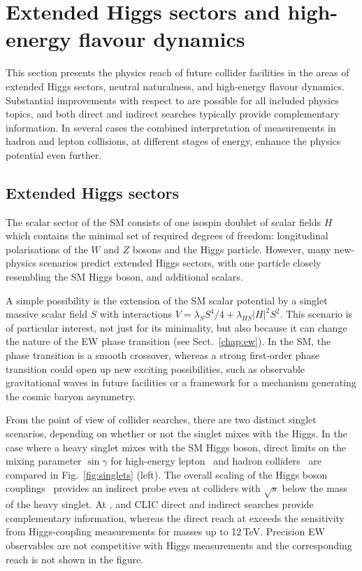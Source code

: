 \documentclass[../report.tex]{subfiles}
\begin{document}
\section{Extended Higgs sectors and high-energy flavour dynamics}
\label{sec:BSM-ExtendedScalars}

This section presents the physics reach of future collider facilities in the areas of extended Higgs sectors, neutral naturalness, and high-energy flavour dynamics. Substantial improvements with respect to \HLLHC are possible for all included physics topics, and both direct and indirect searches typically provide complementary information. In several cases the combined interpretation of measurements in hadron and lepton collisions, at different stages of energy, enhance the physics potential even further.

\subsection{Extended Higgs sectors}
The scalar sector of the SM consists of one isospin doublet of scalar fields $H$ which contains the minimal set of required degrees of freedom: longitudinal polarisations of the $W$ and $Z$ bosons and the Higgs particle. However, many new-physics scenarios predict extended Higgs sectors, with one particle closely resembling the SM Higgs boson, and additional scalars.

A simple possibility is the extension of the SM scalar potential by a singlet massive scalar field $S$ with interactions $V= \lambda_{S}S^{4}/4+\lambda_{HS} |H|^{2}S^{2}$. 
This scenario is of particular interest, not just for its minimality, but also because  it can change the nature of the EW phase transition (see Sect.~\ref{chap:ew}). In the SM, the phase transition is a smooth crossover, whereas a strong first-order phase transition could open up new exciting possibilities, such as observable gravitational waves in future facilities or a framework for a mechanism generating the cosmic baryon asymmetry.

From the point of view of collider searches, there are two distinct singlet scenarios, depending on whether or not the singlet mixes with the Higgs. In the case where a heavy singlet mixes with the SM Higgs boson, direct limits on the mixing parameter $\sin \gamma$ for high-energy lepton~\cite{Buttazzo:2018qqp} and hadron colliders~\cite{Sirunyan:2018qlb, CidVidal:2018eel} are compared in Fig.~\ref{fig:singlets} (left). The overall scaling of the Higgs boson couplings~\cite{deBlas:2019rxi} provides an indirect probe even at colliders with $\sqrt{s}$ below the mass of the heavy singlet. At \HLLHC, \HELHC and CLIC direct and indirect searches provide complementary information, whereas the direct reach at \FCChh exceeds the sensitivity from Higgs-coupling measurements for masses up to 12\,TeV. Precision EW observables are not competitive with Higgs measurements and the corresponding reach is not shown in the figure.
\end{document}
